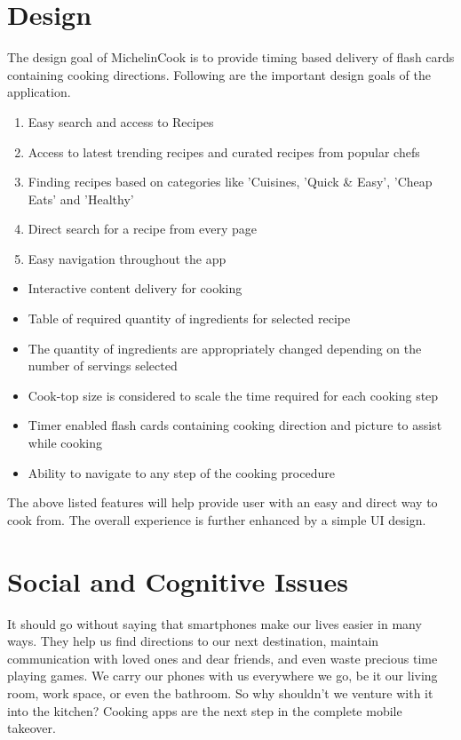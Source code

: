 \section{Design}
The design goal of MichelinCook is to provide timing based delivery of flash cards containing cooking directions. Following are the important design goals of the application.

\begin{enumerate}
	\item Easy search and access to Recipes
	\item Access to latest trending recipes and curated recipes from popular chefs
	\item Finding recipes based on categories like 'Cuisines, 'Quick \& Easy', 'Cheap Eats' and 'Healthy'
	\item Direct search for a recipe from every page
	\item Easy navigation throughout the app
	
\end{enumerate}

\begin{itemize}
\item Interactive content delivery for cooking
\item Table of required quantity of ingredients for selected recipe
\item The quantity of ingredients are appropriately changed depending on the number of servings selected
\item Cook-top size is considered to scale the time required for each cooking step
\item Timer enabled flash cards containing cooking direction and picture to assist while cooking
\item Ability to navigate to any step of the cooking procedure
\end{itemize}

The above listed features will help provide user with an easy and direct way to cook from. The overall experience is further enhanced by a simple UI design.

\section{Social and Cognitive Issues}
It should go without saying that smartphones make our lives easier in many ways. They help us find directions to our next destination, maintain communication with loved ones and dear friends, and even waste precious time playing games. We carry our phones with us everywhere we go, be it our living room, work space, or even the bathroom. So why shouldn't we venture with it into the kitchen? Cooking apps are the next step in the complete mobile takeover.

